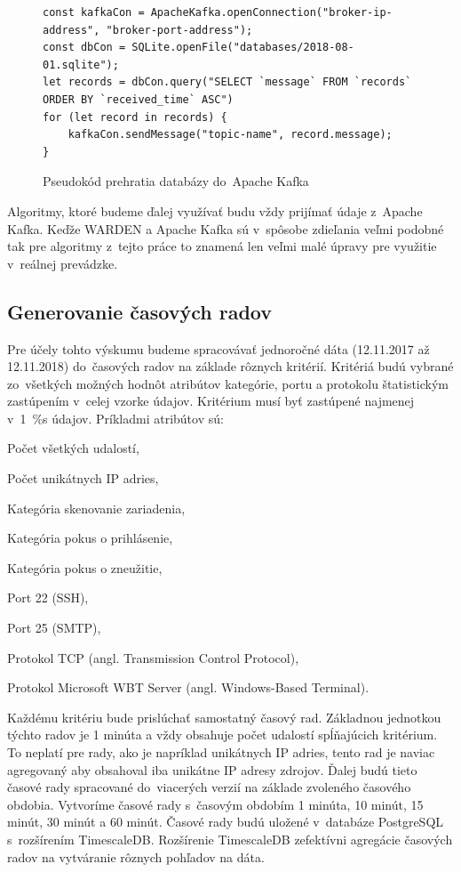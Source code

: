 \documentclass[thesismargins, thesislinespacing, openright, upjsfrontpage]{rnthesis}
\begin{document}
\begin{figure}
    \begin{lstlisting}[]  
const kafkaCon = ApacheKafka.openConnection("broker-ip-address", "broker-port-address");
const dbCon = SQLite.openFile("databases/2018-08-01.sqlite");
let records = dbCon.query("SELECT `message` FROM `records` ORDER BY `received_time` ASC")
for (let record in records) {
    kafkaCon.sendMessage("topic-name", record.message);
}
    \end{lstlisting}
    
    \caption{Pseudokód prehratia databázy do~Apache Kafka}
    \label{alg:prehratie}
\end{figure}

Algoritmy, ktoré budeme ďalej využívať budu vždy prijímať údaje z~Apache Kafka. Keďže WARDEN a Apache Kafka sú v~spôsobe zdieľania veľmi podobné tak pre algoritmy z~tejto práce to znamená len veľmi malé úpravy pre využitie v~reálnej prevádzke.

\subsection{Generovanie časových radov}

Pre účely tohto výskumu budeme spracovávať jednoročné dáta (12.11.2017 až 12.11.2018) do~časových radov na základe rôznych kritérií. Kritériá budú vybrané zo~všetkých možných hodnôt atribútov kategórie, portu a protokolu štatistickým zastúpením v~celej vzorke údajov. Kritérium musí byť zastúpené najmenej v~1~\%s údajov. Príkladmi atribútov sú: 
\begin{compactenum}
    \item Počet všetkých udalostí,
    \item Počet unikátnych IP adries,
    \item Kategória skenovanie zariadenia,
    \item Kategória pokus o prihlásenie,
    \item Kategória pokus o zneužitie,
    \item Port 22 (SSH),
    \item Port 25 (SMTP),
    \item Protokol TCP (angl. Transmission Control Protocol),
    \item Protokol Microsoft WBT Server (angl. Windows-Based Terminal).
\end{compactenum}

Každému kritériu bude prislúchať samostatný časový rad. Základnou jednotkou týchto radov je 1 minúta a vždy obsahuje počet udalostí spĺňajúcich kritérium. To neplatí pre rady, ako je napríklad unikátnych IP adries, tento rad je naviac agregovaný aby obsahoval iba unikátne IP adresy zdrojov. Ďalej budú tieto časové rady spracované do~viacerých verzií na základe zvoleného časového obdobia. Vytvoríme časové rady s~časovým obdobím 1 minúta, 10 minút, 15 minút, 30 minút a 60 minút. Časové rady budú uložené v~databáze PostgreSQL s~rozšírením TimescaleDB. Rozšírenie TimescaleDB zefektívni agregácie časových radov na vytváranie rôznych pohľadov na dáta.
\end{document}
